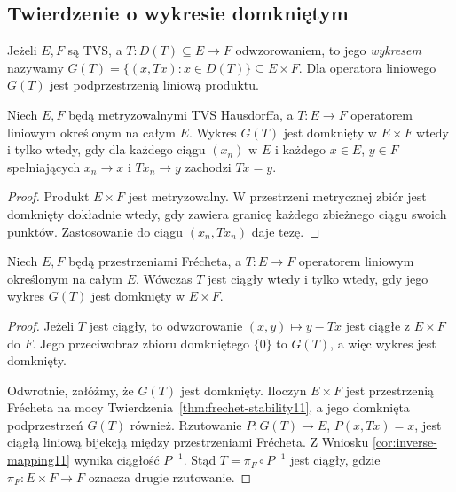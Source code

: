 \subsection{Twierdzenie o wykresie domkniętym}

\begin{definicja}\label{def:graph11}
Jeżeli $E,F$ są TVS, a $T:D(T)\subseteq E\to F$
odwzorowaniem, to jego \emph{wykresem} nazywamy
$G(T)=\{(x,Tx):x\in D(T)\}\subseteq E\times F$.
Dla operatora liniowego $G(T)$ jest podprzestrzenią
liniową produktu.
\end{definicja}

\begin{stwierdzenie}
\label{prop:graph-sequential11}
Niech $E,F$ będą metryzowalnymi TVS Hausdorffa, a
$T:E\to F$ operatorem liniowym określonym na całym $E$.
Wykres $G(T)$ jest domknięty w $E\times F$ wtedy i tylko
wtedy, gdy dla każdego ciągu $(x_n)$ w $E$ i każdego
$x\in E$, $y\in F$ spełniających $x_n\to x$ i
$Tx_n\to y$ zachodzi $Tx=y$.
\end{stwierdzenie}
\begin{proof}
Produkt $E\times F$ jest metryzowalny. W przestrzeni
metrycznej zbiór jest domknięty dokładnie wtedy, gdy
zawiera granicę każdego zbieżnego ciągu swoich punktów.
Zastosowanie do ciągu $(x_n,Tx_n)$ daje tezę.
\end{proof}

\begin{twierdzenie}\label{thm:closed-graph11}
Niech $E,F$ będą przestrzeniami Frécheta, a
$T:E\to F$ operatorem liniowym określonym na całym $E$.
Wówczas $T$ jest ciągły wtedy i tylko wtedy,
gdy jego wykres $G(T)$ jest domknięty w $E\times F$.
\end{twierdzenie}
\begin{proof}
Jeżeli $T$ jest ciągły, to odwzorowanie
$(x,y)\mapsto y-Tx$ jest ciągłe z $E\times F$ do $F$.
Jego przeciwobraz zbioru domkniętego $\{0\}$ to $G(T)$,
a więc wykres jest domknięty.

Odwrotnie, załóżmy, że $G(T)$ jest domknięty.
Iloczyn $E\times F$ jest przestrzenią Frécheta
na mocy Twierdzenia~\ref{thm:frechet-stability11},
a jego domknięta podprzestrzeń $G(T)$ również.
Rzutowanie
$P:G(T)\to E$, $P(x,Tx)=x$, jest ciągłą liniową
bijekcją między przestrzeniami Frécheta. Z Wniosku
\ref{cor:inverse-mapping11} wynika ciągłość $P^{-1}$.
Stąd $T=\pi_F\circ P^{-1}$ jest ciągły, gdzie
$\pi_F:E\times F\to F$ oznacza drugie rzutowanie.
\end{proof}

